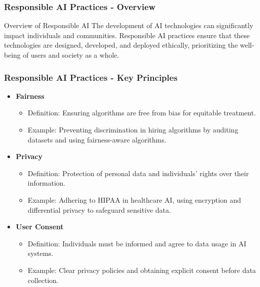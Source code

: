 \documentclass[aspectratio=169]{beamer}
\begin{document}
\begin{frame}[fragile]
    \frametitle{Responsible AI Practices - Overview}
    \begin{block}{Overview of Responsible AI}
        The development of AI technologies can significantly impact individuals and communities. Responsible AI practices ensure that these technologies are designed, developed, and deployed ethically, prioritizing the well-being of users and society as a whole.
    \end{block}
\end{frame}

\begin{frame}[fragile]
    \frametitle{Responsible AI Practices - Key Principles}
    \begin{itemize}
        \item \textbf{Fairness} 
        \begin{itemize}
            \item Definition: Ensuring algorithms are free from bias for equitable treatment.
            \item Example: Preventing discrimination in hiring algorithms by auditing datasets and using fairness-aware algorithms.
        \end{itemize}
        
        \item \textbf{Privacy}
        \begin{itemize}
            \item Definition: Protection of personal data and individuals' rights over their information.
            \item Example: Adhering to HIPAA in healthcare AI, using encryption and differential privacy to safeguard sensitive data.
        \end{itemize}
        
        \item \textbf{User Consent}
        \begin{itemize}
            \item Definition: Individuals must be informed and agree to data usage in AI systems.
            \item Example: Clear privacy policies and obtaining explicit consent before data collection.
        \end{itemize}
    \end{itemize}
\end{frame}
\end{document}
